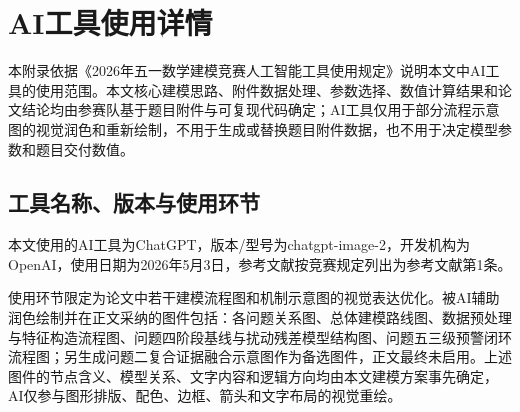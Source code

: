 
\newcommand{\AppendixPyFile}[2]{%
  \subsection{#1}
  
}

\newcommand{\AppendixPyRangeFile}[4]{%
  \subsection{#1}
  
}

\newcommand{\AppendixTxtFile}[2]{%
  \subsection{#1}
  
}

\chapter{AI工具使用详情}

本附录依据《2026年五一数学建模竞赛人工智能工具使用规定》说明本文中AI工具的使用范围。本文核心建模思路、附件数据处理、参数选择、数值计算结果和论文结论均由参赛队基于题目附件与可复现代码确定；AI工具仅用于部分流程示意图的视觉润色和重新绘制，不用于生成或替换题目附件数据，也不用于决定模型参数和题目交付数值。

\section{工具名称、版本与使用环节}

本文使用的AI工具为ChatGPT，版本/型号为chatgpt-image-2，开发机构为OpenAI，使用日期为2026年5月3日，参考文献按竞赛规定列出为参考文献第1条。

使用环节限定为论文中若干建模流程图和机制示意图的视觉表达优化。被AI辅助润色绘制并在正文采纳的图件包括：各问题关系图、总体建模路线图、数据预处理与特征构造流程图、问题四阶段基线与扰动残差模型结构图、问题五三级预警闭环流程图；另生成问题二复合证据融合示意图作为备选图件，正文最终未启用。上述图件的节点含义、模型关系、文字内容和逻辑方向均由本文建模方案事先确定，AI仅参与图形排版、配色、边框、箭头和文字布局的视觉重绘。

